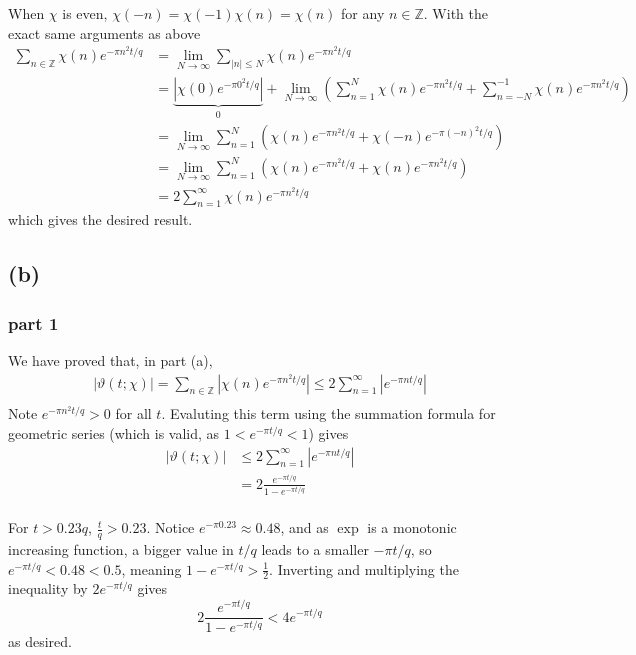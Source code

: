 \documentclass{article}
\theoremstyle{definition}
\theoremstyle{definition}
\theoremstyle{remark}
\renewcommand{\t}{\vartheta}
\newcommand{\x}{\chi}
\newcommand{\bb}[1]{\mathbb{#1}} %
\begin{document}
When $\chi$ is even, $\chi(-n) = \chi(-1) \chi(n) = \chi(n)$ for any $n \in \bb{Z}$.
With the exact same arguments as above
\begin{align}
	\sum_{n \in \mathbb{Z}} \chi(n) e^{-\pi n^2 t/q} 
	&= \lim_{N \rightarrow  \infty}\sum_{|n| \leq N } \chi(n) e^{-\pi n^2 t/q} 
	\\
	&= \underbrace{\left|\chi(0)e^{-\pi 0^2 t/q}\right|}_{0} + \lim_{N \rightarrow  \infty} \left(
	\sum_{n = 1}^{N} \chi(n) e^{-\pi n^2 t/q} + \sum_{n = -N}^{-1} \chi(n) e^{-\pi n^2 t/q}  \right) 
	\\
	&= \lim_{N \rightarrow  \infty} \sum_{n = 1}^{N} \left(\chi(n) e^{-\pi n^2 t/q} +  \chi(-n) e^{-\pi (-n)^2 t/q}\right) 
	\\
	&= \lim_{N \rightarrow  \infty} \sum_{n = 1}^{N} \left(\chi(n) e^{-\pi n^2 t/q} +  \chi(n) e^{-\pi n^2 t/q}\right) 
	\\ 
	&= 2 \sum_{n = 1}^{\infty} \chi(n) e^{-\pi n^2 t/q} 
\end{align}
which gives the desired result.

\subsection*{(b)}
\subsubsection*{part 1}
We have proved that, in part (a),
\begin{align}
	|\t(t; \x)| = \sum_{n \in \mathbb{Z}} \left|\chi(n) e^{-\pi n^2 t/q}\right| 
	\leq 2 \sum_{n = 1}^{\infty} \left|e^{-\pi n t/q}\right| \\ 
\end{align}
Note $e^{-\pi n^2 t/q} > 0$ for all $t$. Evaluting this term using the summation formula for geometric series (which is valid, as $1< e^{-\pi t /q} < 1$) gives 
\begin{align}
	|\t(t; \x)| 
	&\leq 2 \sum_{n = 1}^{\infty} \left|e^{-\pi n t/q}\right| \\ 
	&= 2 \frac{e^{-\pi t/q}}{1 - e^{-\pi t/q}} \\
\end{align}

For $t > 0.23q$, $\frac{t}{q} > 0.23$. 
Notice $e^{-\pi 0.23} \approx 0.48$, and as $\exp$ is a monotonic increasing function, a bigger value in $t/q$ leads to a smaller $-\pi t / q$, so $e^{-\pi t / q} < 0.48 <  0.5$, meaning $1 - e^{-\pi t/q} > \frac{1}{2}$. 
Inverting and multiplying the inequality by $2 e^{-\pi t/q}$ gives
$$
2 \frac{e^{-\pi t/q}}{1 - e^{-\pi t/q}}  < 4 e^{-\pi t/q}
$$
as desired.
\end{document}
